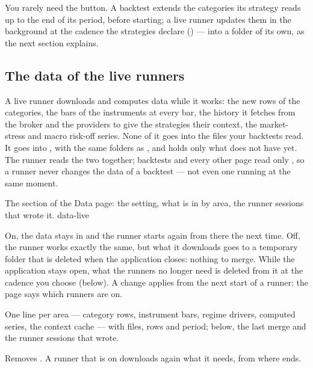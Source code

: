 \noindent
You rarely need the button. A backtest extends the categories its strategy
reads up to the end of its period, before starting; a live runner updates
them in the background at the cadence the strategies declare
() --- into a folder of its own, as the next section
explains.

\subsection{The data of the live runners}\label{sez:data-live}

A live runner downloads and computes data while it works: the new rows of
the categories, the bars of the instruments at every bar, the history it
fetches from the broker and the providers to give the strategies their
context, the market-stress and macro risk-off series. None of it goes into
the files your backtests read. It goes into , with the same
folders as , and holds only what  does not have yet.
The runner reads the two together; backtests and every other page read only
, so a runner never changes the data of a backtest --- not even
one running at the same moment.

  {The  section of the Data page: the setting, what is in
    by area, the runner sessions that wrote it.}
  {data-live}

\begin{description}[leftmargin = 1.4em, style = nextline, itemsep = 4pt]
  \item[\voce{Keep the data the live downloads}] On, the data stays in
     and the runner starts again from there the next time.
    Off, the runner works exactly the same, but what it downloads goes to a
    temporary folder that is deleted when the application closes: nothing to
    merge. While the application stays open, what the runners no longer need
    is deleted from it at the cadence you choose (below). A change applies
    from the next start of a runner; the page says which runners are on.
  \item[The summary] One line per area --- category rows, instrument bars,
    regime drivers, computed series, the context cache --- with files, rows
    and period; below, the last merge and the runner sessions that wrote.
  \item[\pulsante{Delete live data}] Removes . A runner that
    is on downloads again what it needs, from where  ends.
\end{description}

